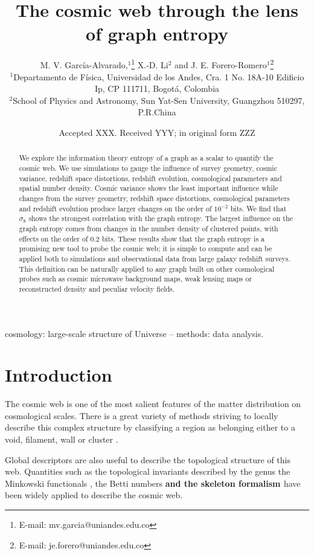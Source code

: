 \documentclass[fleqn,usenatbib]{mnras}
\title[Cosmic Web Graph Entropy]{The cosmic web through the lens of graph entropy}
\author[Garc\'ia-Alvarado et al.]{
M. V. Garc\'ia-Alvarado,$^{1}$\thanks{E-mail: mv.garcia@uniandes.edu.co}
X.-D. Li$^{2}$
and J. E. Forero-Romero$^{1}$\thanks{E-mail: je.forero@uniandes.edu.co}
\\
$^{1}$Departamento de F\'isica, Universidad de los Andes, Cra. 1 No. 18A-10 Edificio Ip, CP 111711, Bogot\'a, Colombia\\
$^{2}$School of Physics and Astronomy, Sun Yat-Sen University, Guangzhou 510297, P.R.China\\
}
\date{Accepted XXX. Received YYY; in original form ZZZ}
\begin{document}
\label{firstpage}
\pagerange{\pageref{firstpage}--\pageref{lastpage}}
\maketitle

\begin{abstract}
  We explore the information theory entropy of a graph as a scalar to
  quantify the cosmic web. 
  We use simulations to gauge the influence of survey geometry, cosmic variance, 
  redshift space distortions, redshift evolution, cosmological parameters and 
  spatial number density.  
  Cosmic variance shows the least important influence while
  changes from the survey geometry, redshift space distortions, cosmological 
  parameters and redshift evolution produce larger changes on the
  order of $10^{-2}$ bits.
  We find that $\sigma_8$ shows the strongest correlation with the graph entropy.
  The largest influence on the graph entropy comes from changes in the 
  number density of clustered points, with effects on the order of $0.2$ bits.
  These results show that the graph entropy is a promising new tool to probe the cosmic 
  web; it is simple to compute and can be applied both to simulations and observational data 
  from large galaxy redshift surveys.
  This definition can be naturally applied to any graph built on other cosmological 
  probes such as cosmic microwave background maps, weak lensing maps or reconstructed
  density and peculiar velocity fields.
\end{abstract}
\begin{keywords}
cosmology: large-scale structure of Universe -- methods: data analysis.
\end{keywords}


\section{Introduction}

The cosmic web is one of the most salient features of the matter distribution
on cosmological scales. 
There is a great variety of methods striving to locally describe this complex 
structure by classifying a region as belonging either
to a void, filament, wall or cluster
\textbf{\citep{2018MNRAS.473.1195L, 2011MNRAS.414..350S}}. 

Global descriptors are also useful to describe the topological structure of this web.
Quantities such as the topological invariants described by  the genus
\citep{1986ApJ...309....1H, 1986ApJ...306..341G} the Minkowski functionals 
\citep{1997ApJ...482L...1S}, the Betti numbers
\citep{2013JKAS...46..125P,2017MNRAS.465.4281P}  \textbf{and the
  skeleton formalism \citep{2008MNRAS.383.1655S}} have been widely
applied to describe the cosmic web. 
\end{document}
